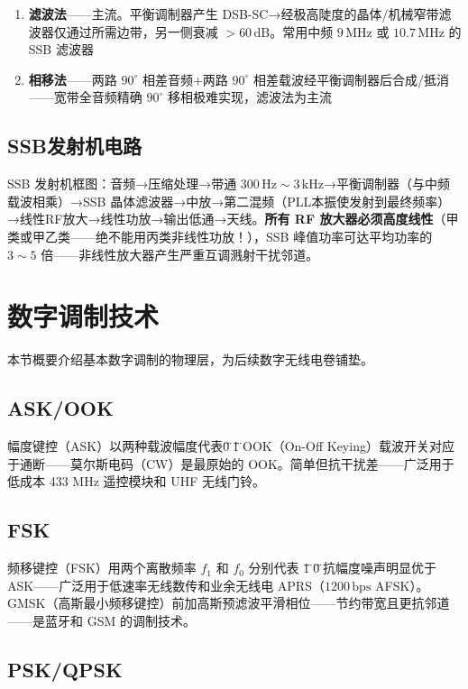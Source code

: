 \documentclass[12pt,UTF8]{ctexbook}
\begin{document}
\begin{enumerate}
\item \textbf{滤波法}——主流。平衡调制器产生 DSB-SC→经极高陡度的晶体/机械窄带滤波器仅通过所需边带，另一侧衰减 $>60\,\mathrm{dB}$。常用中频 $9\,\mathrm{MHz}$ 或 $10.7\,\mathrm{MHz}$ 的 SSB 滤波器
\item \textbf{相移法}——两路 $90^\circ$ 相差音频+两路 $90^\circ$ 相差载波经平衡调制器后合成/抵消——宽带全音频精确 $90^\circ$ 移相极难实现，滤波法为主流
\end{enumerate}

\subsection{SSB发射机电路}

SSB 发射机框图：音频→压缩处理→带通 $300\,\mathrm{Hz}\sim3\,\mathrm{kHz}$→平衡调制器（与中频载波相乘）→SSB 晶体滤波器→中放→第二混频（PLL本振使发射到最终频率）→线性RF放大→线性功放→输出低通→天线。\textbf{所有 RF 放大器必须高度线性}（甲类或甲乙类——绝不能用丙类非线性功放！），SSB 峰值功率可达平均功率的 $3\sim5$ 倍——非线性放大器产生严重互调溅射干扰邻道。

\section{数字调制技术}
\label{sec:digital_modulation}

本节概要介绍基本数字调制的物理层，为后续数字无线电卷铺垫。

\subsection{ASK/OOK}

幅度键控（ASK）以两种载波幅度代表\"0\"和\"1\"。OOK（On-Off Keying）载波开关对应于通断——莫尔斯电码（CW）是最原始的 OOK。简单但抗干扰差——广泛用于低成本 433 MHz 遥控模块和 UHF 无线门铃。

\subsection{FSK}

频移键控（FSK）用两个离散频率 $f_1$ 和 $f_0$ 分别代表 \"1\"和\"0\"。抗幅度噪声明显优于 ASK——广泛用于低速率无线数传和业余无线电 APRS（$1200\,\mathrm{bps}$ AFSK）。GMSK（高斯最小频移键控）前加高斯预滤波平滑相位——节约带宽且更抗邻道——是蓝牙和 GSM 的调制技术。

\subsection{PSK/QPSK}
\end{document}
